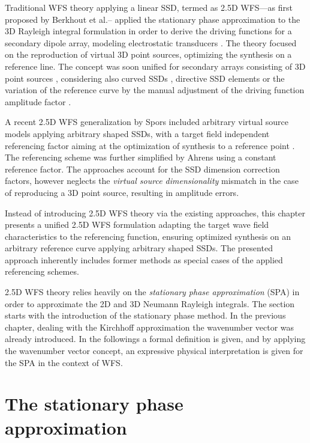 Traditional WFS theory applying a linear SSD, termed as 2.5D WFS---as first proposed by Berkhout et al.-- applied the stationary phase approximation to the 3D Rayleigh integral formulation in order to derive the driving functions for a secondary dipole array, modeling electrostatic transducers \cite{Berkhout1988, Berkhout93}.
The theory focused on the reproduction of virtual 3D point sources, optimizing the synthesis on a reference line.
The concept was soon unified for secondary arrays consisting of 3D point sources \cite{Start1997:phd,Vogel1993:phd, Verheijen1997:phd, Bruijn2004, Hulsebos2004}, considering also curved SSDs \cite{start1996application}, directive SSD elements \cite{devries1996sound} or the variation of the reference curve by the manual adjustment of the driving function amplitude factor \cite{Sonke1998, Sonke2000:Phd}.

A recent 2.5D WFS generalization by Spors included arbitrary virtual source models applying arbitrary shaped SSDs, with a target field independent referencing factor aiming at the optimization of synthesis to a reference point \cite{Spors2008:WFSrevisited}. The referencing scheme was further simplified by Ahrens \cite{Ahrens2012} using a constant reference factor. The approaches account for the SSD dimension correction factors, however neglects the \emph{virtual source dimensionality} mismatch \cite{Voelk2012} in the case of reproducing a 3D point source, resulting in amplitude errors.

Instead of introducing 2.5D WFS theory via the existing approaches, this chapter presents a unified 2.5D WFS formulation adapting the target wave field characteristics to the referencing function, ensuring optimized synthesis on an arbitrary reference curve applying arbitrary shaped SSDs. The presented approach inherently includes former methods as special cases of the applied referencing schemes.

2.5D WFS theory relies heavily on the \emph{stationary phase approximation} (SPA) in order to approximate the 2D and 3D Neumann Rayleigh integrals. The section starts with the introduction of the stationary phase method.
In the previous chapter, dealing with the Kirchhoff approximation the wavenumber vector was already introduced. In the followings a formal definition is given, and by applying the wavenumber vector concept, an expressive physical interpretation is given for the SPA in the context of WFS. 

%
\section{The stationary phase approximation}
\label{Section:25D_WFS:SPA}
%
